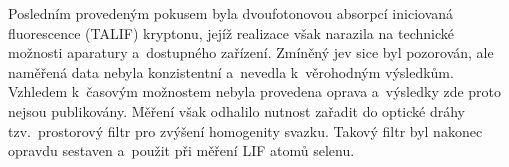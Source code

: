 Posledním provedeným pokusem byla dvoufotonovou absorpcí iniciovaná
fluorescence (TALIF) kryptonu, jejíž realizace však narazila na technické
možnosti aparatury a~dostupného zařízení.
Zmíněný jev sice byl pozorován, ale naměřená data nebyla konzistentní
a~nevedla k~věrohodným výsledkům.
Vzhledem k~časovým možnostem nebyla provedena oprava
a~výsledky zde proto nejsou publikovány.
Měření však odhalilo nutnost zařadit do optické dráhy tzv.~prostorový
filtr pro zvýšení homogenity svazku.
Takový filtr byl nakonec opravdu sestaven a~použit při měření LIF
atomů selenu.
